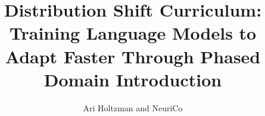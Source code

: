 \documentclass{article}
\title{Distribution Shift Curriculum: Training Language Models to Adapt Faster Through Phased Domain Introduction}
\author{Ari Holtzman and NeuriCo}
\begin{document}
\maketitle

\begin{abstract}

\end{abstract}










\end{document}
